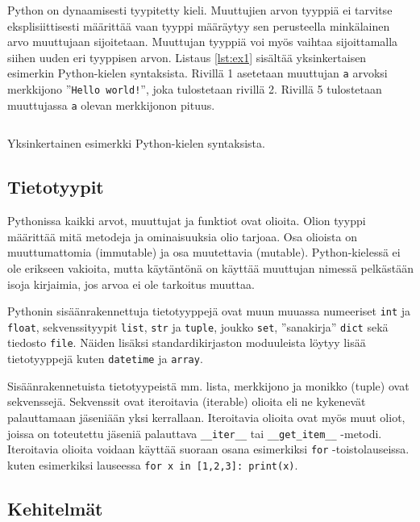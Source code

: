 \documentclass[finnish]{tktltiki2}
\theoremstyle{definition}
\theoremstyle{remark}
\begin{document}
Python on dynaamisesti tyypitetty kieli. Muuttujien arvon tyyppiä ei tarvitse eksplisiittisesti määrittää vaan tyyppi määräytyy sen perusteella minkälainen arvo muuttujaan sijoitetaan. Muuttujan tyyppiä voi myös vaihtaa sijoittamalla siihen uuden eri tyyppisen arvon. Listaus \ref{lst:ex1} sisältää yksinkertaisen esimerkin Python-kielen syntaksista. Rivillä 1 asetetaan muuttujan \verb|a| arvoksi merkkijono ''\verb|Hello world!|'', joka tulostetaan rivillä 2. Rivillä 5 tulostetaan muuttujassa \verb|a| olevan merkkijonon pituus.


\begin{listing}
    \inputminted[linenos]{python}{code/foo.py}
    \caption{Yksinkertainen esimerkki Python-kielen syntaksista.}
    \label{lst:ex1}
\end{listing}

\subsection{Tietotyypit}

Pythonissa kaikki arvot, muuttujat ja funktiot ovat olioita. Olion tyyppi määrittää mitä metodeja ja ominaisuuksia olio tarjoaa. Osa olioista on muuttumattomia (immutable) ja osa muutettavia (mutable). Python-kielessä ei ole erikseen vakioita, mutta käytäntönä on käyttää muuttujan nimessä pelkästään isoja kirjaimia, jos arvoa ei ole tarkoitus muuttaa.

Pythonin sisäänrakennettuja tietotyyppejä ovat muun muuassa numeeriset \verb|int| ja \verb|float|, sekvenssityypit \verb|list|, \verb|str| ja \verb|tuple|, joukko \verb|set|, ''sanakirja'' \verb|dict| sekä tiedosto \verb|file|. Näiden lisäksi standardikirjaston moduuleista löytyy lisää tietotyyppejä kuten \verb|datetime| ja \verb|array|.

Sisäänrakennetuista tietotyypeistä mm. lista, merkkijono ja monikko (tuple) ovat sekvenssejä. Sekvenssit ovat iteroitavia (iterable) olioita eli ne kykenevät palauttamaan jäseniään yksi kerrallaan. Iteroitavia olioita ovat myös muut oliot, joissa on toteutettu jäseniä palauttava \verb|__iter__| tai \verb|__get_item__| -metodi. Iteroitavia olioita voidaan käyttää suoraan osana esimerkiksi \verb|for| -toistolauseissa. kuten esimerkiksi lauseessa \lstinline|for x in [1,2,3]: print(x)|.

\subsection{Kehitelmät}
\end{document}
